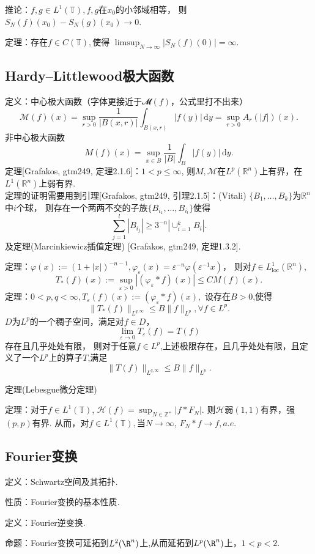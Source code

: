推论：$f,g\in L^1(\mathbb{T}),f,g$在$x_0$的小邻域相等，
则$S_N(f)(x_0)-S_N(g)(x_0)\to 0.$

定理：存在$f\in C(\mathbb{T}),$使得
$\limsup_{N\to \infty}|S_N(f)(0)|=\infty$.

\subsection{Hardy--Littlewood极大函数}
定义：中心极大函数（字体更接近于𝓜$(f)$，公式里打不出来）
$$\mathcal{M}(f)(x)=\sup_{r>0}\frac{1}{|B(x,r)|}\int_{B(x,r)}|f(y)|\,\mathrm{d}y=\sup_{r>0}A_r(\vert f\vert )(x).$$
非中心极大函数
$$M(f)(x)=\sup_{x\in B}\frac{1}{|B|}\int_B |f(y)|\,\mathrm{d}y.$$
定理[Grafakos, gtm249, 定理2.1.6]：$1<p\leq \infty$,
则$M,\mathcal{M}$在$L^p(\mathbb{R}^n)$上有界，在$L^1(\mathbb{R}^n)$上弱有界.\\
定理的证明需要用到引理[Grafakos, gtm249, 引理2.1.5]：(Vitali)
$\{ B_1, \ldots ,B_k \}$为$\mathbb{R}^n$中$i$个球，
则存在一个两两不交的子族$\{ B_{i_1}, \ldots ,B_{i_l} \}$使得
$$\sum _{j=1}^l|B_{i_j}| \geq 3^{-n}|\cup_{i=1}^k B_i|.$$
及定理(Marcinkiewicz插值定理) [Grafakos, gtm249, 定理1.3.2].

定理：$\varphi(x):=(1+|x|)^{-n-1},
\varphi_\varepsilon(x)=\varepsilon^{-n}\varphi(\varepsilon^{-1}x)$，
则对$f\in L^1_{\text{loc}}(\mathbb{R}^n)$,
$$T_*(f)(x):=\sup_{\varepsilon>0}|(\varphi_\varepsilon*f)(x)|\leq CM(f)(x).$$
定理：$0<p,q<\infty,T_\varepsilon(f)(x):=(\varphi_\varepsilon*f)(x),$
设存在$B>0$,使得
$$\|T_*(f)\|_{L^{q,\infty}}\leq B\|f \|_{L^p},\forall f\in L^p.$$
$D$为$L^p$的一个稠子空间，满足对$f\in D$，
$$\lim_{\varepsilon \to 0}T_\varepsilon(f)=T(f)$$存在且几乎处处有限，
则对于任意$f\in L^p$,上述极限存在，且几乎处处有限，且定义了一个$L^p$上的算子$T$,满足
$$\|T(f)\|_{L^{q,\infty}} \leq B\|f\|_{L^p}.$$

定理(Lebesgue微分定理)

定理：对于$f\in L^1(\mathbb{T})$,
$\mathscr{H}(f)=\sup_{N\in \mathbb{Z}^+}|f*F_N|$.
则$\mathscr{H}$弱$(1,1)$有界，强$(p,p)$有界.
从而，对$f\in L^1(\mathbb{T}),$当$N\to \infty$, $F_N*f\to f,a.e.$

\subsection{Fourier变换}
定义：Schwartz空间及其拓扑.

性质：Fourier变换的基本性质.

定义：Fourier逆变换.

命题：Fourier变换可延拓到$L^2(\R^n)$上,从而延拓到$L^p(\R^n)$上，$1<p<2$.

